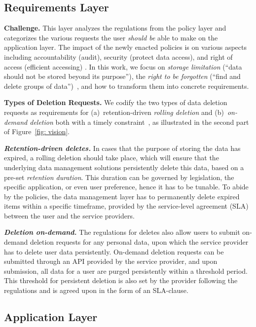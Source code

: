 \documentclass[11pt,dvipdfmx]{article}
\newcommand\Paragraph[1]{\vspace{0.02in}  \noindent \textbf{#1.}}
\newcommand\Paragraphbit[1]{\vspace{0.02in}  \noindent \textbf{\textit{#1.}}}
\begin{document}
\subsection{Requirements Layer}
\vspace{-0.05in}

\Paragraph{Challenge} 
This layer analyzes the regulations from the policy layer and categorizes the various requests the
user \emph{should be} able to make on the application layer. The impact of the newly enacted policies
is on various aspects including accountability (audit), security (protect data access), and right of access
(efficient accessing) \cite{Shah2019,Shastri2021}. In this work, we focus on \emph{storage limitation} 
(``data should not be stored beyond its purpose''), the \emph{right to be forgotten} (``find and
delete groups of data'')~\cite{Shah2019}, and how to transform them into concrete requirements.



\Paragraph{Types of Deletion Requests} 
We codify the two types of data deletion requests as requirements for (a)~retention-driven \emph{rolling 
deletion} and (b)~\emph{on-demand deletion} both with a timely constraint~\cite{Sarkar2020}, as illustrated 
in the second part of Figure~\ref{fig: vision}.

\Paragraphbit{Retention-driven deletes} 
In cases that the purpose of storing the data has expired, a rolling deletion should take place, which
will ensure that the underlying data management solutions persistently delete this data, based on a
pre-set \textit{retention duration}. This duration can be governed by legislation, the specific application,
or even user preference, hence it has to be tunable. To abide by the policies, the data management
layer has to permanently delete expired items within a specific timeframe, provided by the service-level
agreement (SLA) between the user and the service providers.

\Paragraphbit{Deletion on-demand} 
The regulations for deletes also allow users to submit on-demand deletion requests for any personal data,
upon which the service provider has to delete user data persistently. 
On-demand deletion requests can be submitted through an API provided by the service provider, and upon 
submission, all data for a user are purged persistently within a threshold period. 
This threshold for persistent deletion is also set by the provider following the regulations and is 
agreed upon in the form of an SLA-clause. 


\subsection{Application Layer}
\vspace{-0.05in}
\end{document}
